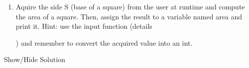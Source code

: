 \documentclass[letterpaper,10pt,english]{sphinxmanual}
\begin{document}
\begin{enumerate}
%
\setcounter{enumi}{1}
\item {} 
\sphinxAtStartPar
Aquire the side S (base of a square) from the user at runtime and compute the area of a square. Then, assign the result to a variable named area and print it.
Hint: use the input function (details %
\begin{footnote}[13]\sphinxAtStartFootnote
{}
%
\end{footnote}) and remember to convert the acquired value into an int.

\end{enumerate}



\sphinxAtStartPar
Show/Hide Solution
\end{document}
